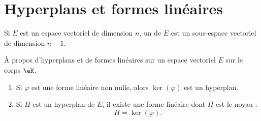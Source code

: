 
\section{Hyperplans et formes linéaires}

\begin{definition}      \label{DEFooEWDTooQbUQws}
	Si \( E\) est un espace vectoriel de dimension \( n\), un  de \( E\) est un sous-espace vectoriel de dimension \( n-1\).
\end{definition}

\begin{proposition}      \label{PROPooVYJUooAWDQrZ}
	À propos d'hyperplans et de formes linéaires sur un espace vectoriel \( E\) sur le corps \( \eK\).
	\begin{enumerate}
		\item
		      Si \( \varphi\) est une forme linéaire non nulle, alors \( \ker(\varphi)\) est un hyperplan.
		\item
		      Si \( H\) est un hyperplan de \( E\), il existe une forme linéaire dont \( H\) est le noyau :
		      \begin{equation}
			      H=\ker(\varphi).
		      \end{equation}
	\end{enumerate}
\end{proposition}


